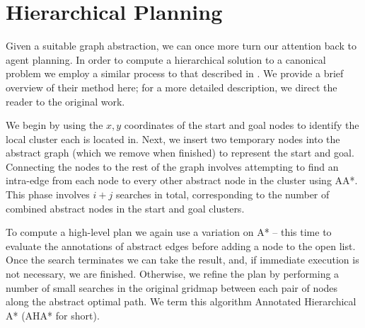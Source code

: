 \section{Hierarchical Planning}
Given a suitable graph abstraction, we can once more turn our attention back to agent planning. 
In order to compute a hierarchical solution to a canonical problem we employ a similar process to that described in \cite{botea04}.
We provide a brief overview of their method here; for a more detailed description, we direct the reader to the original work.
\par \indent
We begin by using the $x,y$ coordinates of the start and goal  nodes to identify the local cluster each is located in. 
Next, we insert two temporary nodes into the abstract graph (which we remove when finished) to represent the start and goal.
Connecting the nodes to the rest of the graph involves attempting to find an intra-edge from each node to every other abstract node in the cluster using AA*. 
This phase involves $i+j$ searches in total, corresponding to the number of combined abstract nodes in the start and goal clusters.
\par \indent
To compute a high-level plan we again use a variation on A* -- this time to evaluate the annotations of abstract edges before adding a node to the open list.
Once the search terminates we can take the result, and, if immediate execution is not necessary, we are finished. 
Otherwise, we refine the plan by performing a number of small searches in the original gridmap between each pair of nodes along the abstract optimal path. 
We term this algorithm Annotated Hierarchical A* (AHA* for short).
